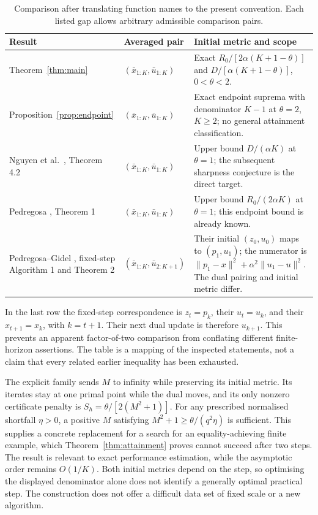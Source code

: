 \documentclass[11pt,a4paper]{article}
\theoremstyle{remark}\newtheorem{remark}[theorem]{Remark}
\newcommand{\norm}[1]{\lVert #1\rVert}
\begin{document}
\begin{table}[htbp]
\centering\small
\caption{Comparison after translating function names to the present convention. Each listed gap allows arbitrary admissible comparison pairs.}\label{tab:prior}
\begin{tabular}{@{}p{33mm}p{42mm}p{76mm}@{}}
\toprule
Result & Averaged pair & Initial metric and scope\\
\midrule
Theorem~\ref{thm:main} & $(\bar x_{1:K},\bar u_{1:K})$ & Exact $R_0/[2\alpha(K+1-\theta)]$ and $D/[\alpha(K+1-\theta)]$, $0<\theta<2$.\\[5pt]
Proposition~\ref{prop:endpoint} & $(\bar x_{1:K},\bar u_{1:K})$ & Exact endpoint suprema with denominator $K-1$ at $\theta=2$, $K\ge2$; no general attainment classification.\\[5pt]
Nguyen et al.\ \cite{nguyen2025}, Theorem 4.2 & $(\bar x_{1:K},\bar u_{1:K})$ & Upper bound $D/(\alpha K)$ at $\theta=1$; the subsequent sharpness conjecture is the direct target.\\[5pt]
Pedregosa \cite{pedregosa2018}, Theorem 1 & $(\bar x_{1:K},\bar u_{1:K})$ & Upper bound $R_0/(2\alpha K)$ at $\theta=1$; this endpoint bound is already known.\\[5pt]
Pedregosa--Gidel \cite{pedregosa2018adaptive}, fixed-step Algorithm 1 and Theorem 2 & $(\bar x_{1:K},\bar u_{2:K+1})$ & Their initial $(z_0,u_0)$ maps to $(p_1,u_1)$; the numerator is $\norm{p_1-x}^2+\alpha^2\norm{u_1-u}^2$. The dual pairing and initial metric differ.\\
\bottomrule
\end{tabular}
\end{table}

In the last row the fixed-step correspondence is $z_t=p_k$, their $u_t=u_k$, and their $x_{t+1}=x_k$, with $k=t+1$. Their next dual update is therefore $u_{k+1}$. This prevents an apparent factor-of-two comparison from conflating different finite-horizon assertions. The table is a mapping of the inspected statements, not a claim that every related earlier inequality has been exhausted.

The explicit family sends $M$ to infinity while preserving its initial metric. Its iterates stay at one primal point while the dual moves, and its only nonzero certificate penalty is $S_h=\theta/[2(M^2+1)]$. For any prescribed normalised shortfall $\eta>0$, a positive $M$ satisfying $M^2+1\ge\theta/(q^2\eta)$ is sufficient. This supplies a concrete replacement for a search for an equality-achieving finite example, which Theorem~\ref{thm:attainment} proves cannot succeed after two steps. The result is relevant to exact performance estimation, while the asymptotic order remains $O(1/K)$. Both initial metrics depend on the step, so optimising the displayed denominator alone does not identify a generally optimal practical step. The construction does not offer a difficult data set of fixed scale or a new algorithm.
\end{document}
